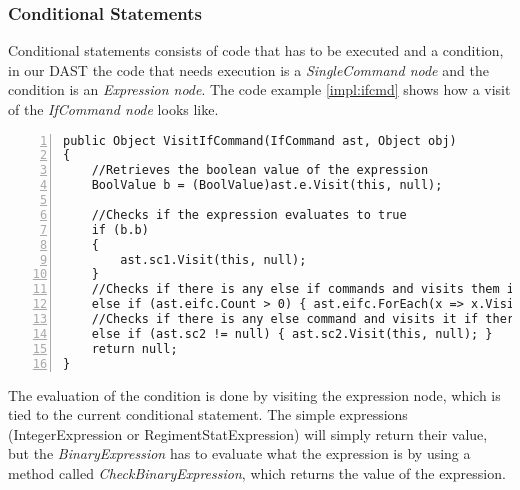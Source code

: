 	\subsubsection{Conditional Statements}
		Conditional statements consists of code that has to be executed and a condition, in our DAST the code that needs execution is a 
		{\it SingleCommand node} and the condition is an {\it Expression node}. 
		The code example \ref{impl:ifcmd} shows how a visit of the {\it IfCommand node} looks like.
		\begin{lstlisting}[basicstyle=\small\sffamily,
			keywords={break,case,const,continue,default,else,enum,
			for,if,return,switch,while,do,long,void,int,float,double,
			char,struct,typedef,include,size\_t},
			keywordstyle={\color{blue}},
			comment={[l]{//}}, morecomment={[s]{/*}{*/}}, commentstyle=\itshape,
			columns={[l]flexible}, numbers=left, numberstyle=\tiny,
			frameround=fftt, frame=shadowbox, captionpos=b,
			caption={VisitIfCommand method from the class BehaviourInterpreter},
			label=impl:ifcmd]
public Object VisitIfCommand(IfCommand ast, Object obj)
{
	//Retrieves the boolean value of the expression
	BoolValue b = (BoolValue)ast.e.Visit(this, null);
	
	//Checks if the expression evaluates to true
	if (b.b)
	{
		ast.sc1.Visit(this, null);
	}
	//Checks if there is any else if commands and visits them if there is
	else if (ast.eifc.Count > 0) { ast.eifc.ForEach(x => x.Visit(this, null)); }
	//Checks if there is any else command and visits it if there is
	else if (ast.sc2 != null) { ast.sc2.Visit(this, null); }
	return null;
}	
		\end{lstlisting}
		The evaluation of the condition is done by visiting the expression node, which is tied to the current conditional statement. 
		The simple expressions (IntegerExpression or RegimentStatExpression) will simply return their value, but the {\it BinaryExpression} 
		has to evaluate what the expression is by using a method called {\it CheckBinaryExpression}, which returns the value of the expression.
